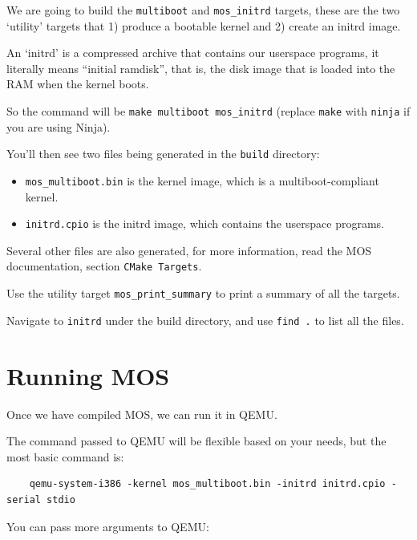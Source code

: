 We are going to build the \texttt{multiboot} and \texttt{mos\_initrd} targets, these are the two
`utility' targets that 1) produce a bootable kernel and 2) create an initrd image.

An `initrd' is a compressed archive that contains our userspace programs, it literally means ``initial ramdisk'',
that is, the disk image that is loaded into the RAM when the kernel boots.

So the command will be \texttt{make multiboot mos\_initrd} (replace \texttt{make} with \texttt{ninja} if you are using Ninja).

You'll then see two files being generated in the \texttt{build} directory:

\begin{itemize}
    \item \texttt{mos\_multiboot.bin} is the kernel image, which is a multiboot-compliant kernel.
    \item \texttt{initrd.cpio} is the initrd image, which contains the userspace programs.
\end{itemize}

Several other files are also generated, for more information, read the MOS documentation, section \texttt{CMake Targets}.

\begin{exercise}
    \item Use the utility target \texttt{mos\_print\_summary} to print a summary of all the targets.
    \item Navigate to \texttt{initrd} under the build directory, and use \texttt{find .} to list all the files.
\end{exercise}

\section{Running MOS}

Once we have compiled MOS, we can run it in QEMU.

The command passed to QEMU will be flexible based on your needs, but the most basic command is:

\begin{verbatim}
    qemu-system-i386 -kernel mos_multiboot.bin -initrd initrd.cpio -serial stdio
\end{verbatim}

You can pass more arguments to QEMU:

